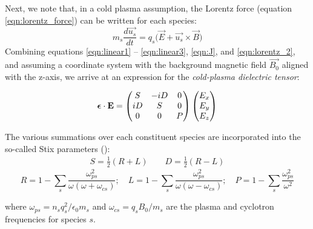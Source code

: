 Next, we note that, in a cold plasma assumption, the Lorentz force (equation \ref{eqn:lorentz_force}) can be written for each species:
\begin{equation}
m_s\frac{d\vec{u_s}}{dt} = q_s\big(\vec{E} + \vec{u_s}\times\vec{B}\big) 
\label{eqn:lorentz_2}
\end{equation}
Combining equations \ref{eqn:linear1} -- \ref{eqn:linear3}, \ref{eqn:J}, and \ref{eqn:lorentz_2}, and assuming a coordinate system with the background magnetic field $\vec{B_0}$ aligned with the z-axis, we arrive at an expression for the \emph{cold-plasma dielectric tensor}:

\begin{equation}
\boldsymbol{\epsilon}\cdot\mathbf{E}=\begin{pmatrix}
S & -iD & 0 \\
iD & S & 0 \\
0 & 0 & P \end{pmatrix}\begin{pmatrix}E_x \\ E_y \\ E_z\end{pmatrix}
\end{equation}

The various summations over each constituent species are incorporated into the so-called Stix parameters (\cite{Stix1992}):
\begin{eqnarray}
S =\frac{1}{2}(R + L) \qquad D = \frac{1}{2}(R - L)
\label{eqn:stix_params_1}
\end{eqnarray}
\begin{equation}
R = 1 - \sum_s\frac{\omega_{ps}^2}{\omega(\omega + \omega_{cs})}; \quad L = 1 - \sum_s\frac{\omega_{ps}^2}{\omega(\omega - \omega_{cs})}; \quad P = 1 - \sum_s\frac{\omega_{ps}^2}{\omega^2}
\label{eqn:stix_params_2}
\end{equation}

where $\omega_{ps} = n_sq_s^2/{\epsilon_0 m_s}$ and $\omega_{cs}=q_sB_0/m_s$ are the plasma and cyclotron frequencies for species $s$.

